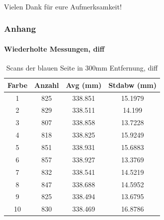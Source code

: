 \documentclass[xcolor=dvipsnames]{beamer}
\def\framesubtitles#1{\framesubtitle{\hspace{3.5ex}#1}}
\begin{document}
\begin{frame}
\begin{columns}
	\end{columns}

\end{frame}


\begin{frame}
	\frametitle{\mbox{}}
	\framesubtitles{}
	\center \LARGE Vielen Dank für eure Aufmerksamkeit!
\end{frame}


\begin{frame}[noframenumbering]
	\frametitle{Anhang}
	\framesubtitle{Wiederholte Messungen, diff}
	\begin{table}
		\begin{tabular}{c|c|c|c}
			Farbe & Anzahl & Avg (mm) & Stdabw (mm) \\
			\hline
			1 & 825 & 338.851 & 15.1979 \\
			2 & 829 & 338.511 & 14.199 \\
			3 & 807 & 338.858 & 13.7228 \\
			4 & 818 & 338.825 & 15.9249 \\
			5 & 851 & 338.931 & 15.6883 \\
			6 & 857 & 338.927 & 13.3769 \\
			7 & 832 & 338.541 & 14.5219 \\
			8 & 847 & 338.688 & 14.5952 \\
			9 & 825 & 338.494 & 13.6795 \\
			10 & 830 & 338.469 & 16.8786 \\
		\end{tabular}
		\caption{Scans der blauen Seite in 300mm Entfernung, diff}
	\end{table}
\end{frame}
\end{document}

